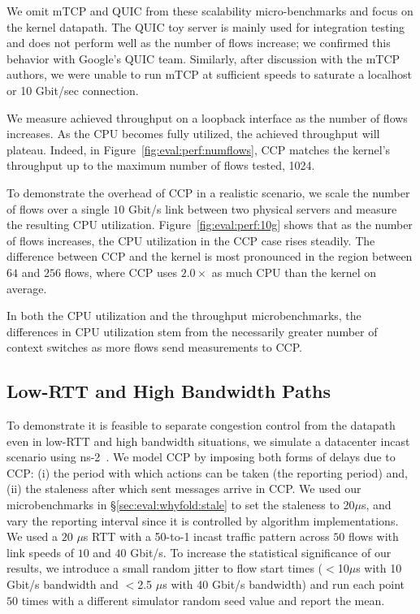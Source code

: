 We omit mTCP and QUIC from these scalability micro-benchmarks and focus on the kernel datapath. The QUIC toy server is mainly used for integration testing and does not perform well as the number of flows increase; we confirmed this behavior with Google's QUIC team. Similarly, after discussion with the mTCP authors, we were unable to run mTCP at sufficient speeds to saturate a localhost or 10 Gbit/sec connection.

 We measure achieved throughput on a loopback interface as the number of flows increases. As the CPU becomes fully utilized, the achieved throughput will plateau. Indeed, in Figure~\ref{fig:eval:perf:numflows}, CCP matches the kernel's throughput up to the maximum number of flows tested, 1024. 

 To demonstrate the overhead of CCP in a realistic scenario, we scale the number of flows over a single $10$ Gbit/s link between two physical servers and measure the resulting CPU utilization.
Figure~\ref{fig:eval:perf:10g} shows that as the number of flows increases, the CPU utilization in the CCP case rises steadily. The difference between CCP and the kernel is most pronounced in the region between $64$ and $256$ flows, where CCP uses $2.0\times$ as much CPU than the kernel on average.

In both the CPU utilization and the throughput microbenchmarks, the differences in CPU utilization stem from the necessarily greater number of context switches as more flows send measurements to CCP.

\subsection{Low-RTT and High Bandwidth Paths}
\label{sec:eval:lowrtt}

To demonstrate it is feasible to separate congestion control from the datapath even in low-RTT and high bandwidth situations, we simulate a datacenter incast scenario using ns-2~\cite{ns2}.
We model CCP by imposing both forms of delays due to CCP: (i) the period with which actions can be taken (the reporting period) and, (ii) the staleness after which sent messages arrive in CCP. We used our microbenchmarks in \S\ref{sec:eval:whyfold:stale} to set the staleness to 20$\mu$s, and vary the reporting interval since it is controlled by algorithm implementations. 
We used a $20$ $\mu$s RTT with a 50-to-1 incast traffic pattern across $50$ flows with link speeds of $10$ and $40$ Gbit/s. To increase the statistical significance of our results, we introduce a small random jitter to flow start times ($<$10$ \mu$s with 10 Gbit/s bandwidth and $<$2.5 $\mu$s with 40 Gbit/s bandwidth) and run each point $50$ times with a different simulator random seed value and report the mean.

